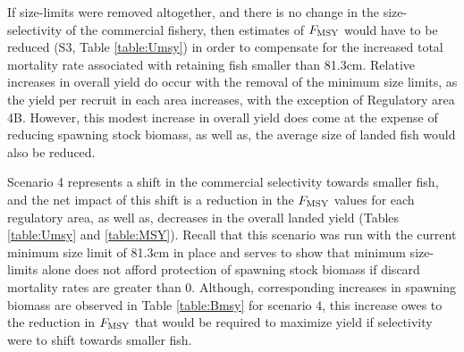 If size-limits were removed altogether, and there is no change in the size-selectivity of the commercial fishery, then estimates of $F_{\rm{MSY}}$ would have to be reduced (S3, Table \ref{table:Umsy}) in order to compensate for the increased total mortality rate associated with retaining fish smaller than 81.3cm.  Relative increases in overall yield do occur with the removal of the minimum size limits, as the yield per recruit in each area increases, with the exception of Regulatory area 4B.  However, this modest increase in overall yield does come at the expense of reducing spawning stock biomass, as well as, the average size of landed fish would also be reduced.

Scenario 4 represents a shift in the commercial selectivity towards smaller fish, and the net impact of this shift is a reduction in the $F_{\rm{MSY}}$ values for each regulatory area, as well as, decreases in the overall landed yield (Tables \ref{table:Umsy} and \ref{table:MSY}).  Recall that this scenario was run with the current minimum size limit of 81.3cm in place and serves to show that minimum size-limits alone does not afford protection of spawning stock biomass if discard mortality rates are greater than 0.  Although, corresponding increases in spawning biomass are observed in Table \ref{table:Bmsy} for scenario 4, this increase owes to the reduction in $F_{\rm{MSY}}$ that would be required to maximize yield if selectivity were to shift towards smaller fish.

